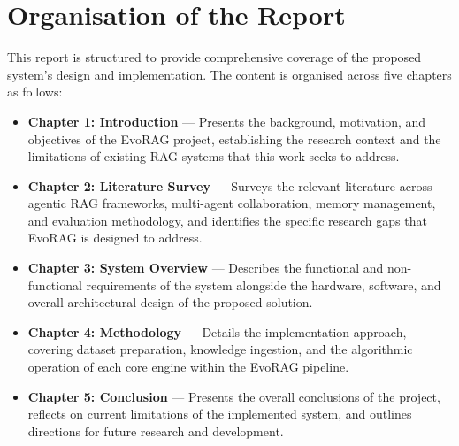 \section{Organisation of the Report}

This report is structured to provide comprehensive coverage of the proposed system's
design and implementation. The content is organised across five chapters as follows:

\begin{itemize}
    \item \textbf{Chapter 1: Introduction} — Presents the background, motivation, and
          objectives of the EvoRAG project, establishing the research context and the
          limitations of existing RAG systems that this work seeks to address.

    \item \textbf{Chapter 2: Literature Survey} — Surveys the relevant literature
          across agentic RAG frameworks, multi-agent collaboration, memory management,
          and evaluation methodology, and identifies the specific research gaps that
          EvoRAG is designed to address.

    \item \textbf{Chapter 3: System Overview} — Describes the functional and
          non-functional requirements of the system alongside the hardware, software,
          and overall architectural design of the proposed solution.

    \item \textbf{Chapter 4: Methodology} — Details the implementation approach,
          covering dataset preparation, knowledge ingestion, and the algorithmic
          operation of each core engine within the EvoRAG pipeline.

    \item \textbf{Chapter 5: Conclusion} — Presents the overall conclusions of the
          project, reflects on current limitations of the implemented system, and
          outlines directions for future research and development.
\end{itemize}